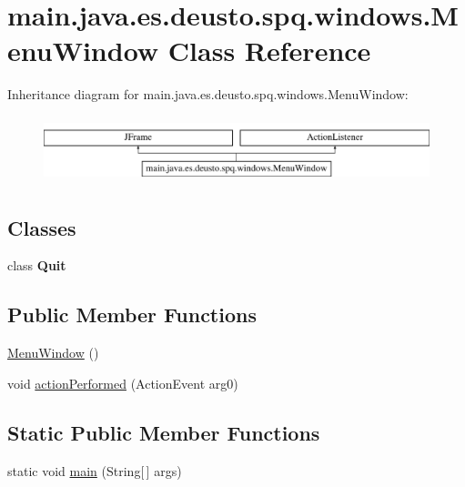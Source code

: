 \hypertarget{classmain_1_1java_1_1es_1_1deusto_1_1spq_1_1windows_1_1_menu_window}{}\section{main.\+java.\+es.\+deusto.\+spq.\+windows.\+Menu\+Window Class Reference}
\label{classmain_1_1java_1_1es_1_1deusto_1_1spq_1_1windows_1_1_menu_window}
Inheritance diagram for main.\+java.\+es.\+deusto.\+spq.\+windows.\+Menu\+Window\+:\begin{figure}[H]
\begin{center}
\leavevmode
\includegraphics[height=1.951219cm]{classmain_1_1java_1_1es_1_1deusto_1_1spq_1_1windows_1_1_menu_window}
\end{center}
\end{figure}
\subsection*{Classes}
\begin{DoxyCompactItemize}
\item 
class {\bfseries Quit}
\end{DoxyCompactItemize}
\subsection*{Public Member Functions}
\begin{DoxyCompactItemize}
\item 
\hyperlink{classmain_1_1java_1_1es_1_1deusto_1_1spq_1_1windows_1_1_menu_window_a873f49767242873a6267f460dcf0f41d}{Menu\+Window} ()
\item 
void \hyperlink{classmain_1_1java_1_1es_1_1deusto_1_1spq_1_1windows_1_1_menu_window_a03b991737dc73a911d888d114e57656b}{action\+Performed} (Action\+Event arg0)
\end{DoxyCompactItemize}
\subsection*{Static Public Member Functions}
\begin{DoxyCompactItemize}
\item 
static void \hyperlink{classmain_1_1java_1_1es_1_1deusto_1_1spq_1_1windows_1_1_menu_window_a4f4ad79d75c1fe7fa91cd8bb42e199b3}{main} (String\mbox{[}$\,$\mbox{]} args)
\end{DoxyCompactItemize}


